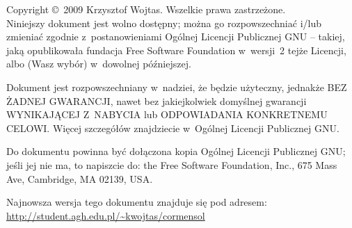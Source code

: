 		\vspace{10ex}

		\begin{small}
			Copyright \copyright\ 2009 Krzysztof Wojtas. Wszelkie prawa zastrzeżone.\\

			Niniejszy dokument jest wolno dostępny; można go rozpowszechniać i/lub zmieniać zgodnie z~postanowieniami Ogólnej Licencji Publicznej GNU -- takiej, jaką opublikowała fundacja Free Software Foundation w~wersji~2 tejże Licencji, albo (Wasz wybór) w~dowolnej późniejszej.

			Dokument jest rozpowszechniany w~nadziei, że będzie użyteczny, jednakże BEZ ŻADNEJ GWARANCJI, nawet bez jakiejkolwiek domyślnej gwarancji WYNIKAJĄCEJ Z~NABYCIA lub ODPOWIADANIA KONKRETNEMU CELOWI. Więcej szczegółów znajdziecie w~Ogólnej Licencji Publicznej GNU.

			Do dokumentu powinna być dołączona kopia Ogólnej Licencji Publicznej GNU; jeśli jej nie ma, to napiszcie do: the Free Software Foundation, Inc., 675 Mass Ave, Cambridge, MA 02139, USA.
		\end{small}

	\endgroup


	\noindent Najnowsza wersja tego dokumentu znajduje się pod adresem:\\
	\url{http://student.agh.edu.pl/~kwojtas/cormensol}

	\newpage

\endgroup

\endinput
